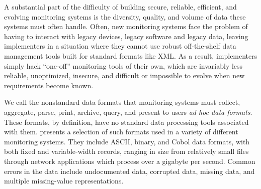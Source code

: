 \documentclass[10pt]{article}
\begin{document}
A substantial part of the difficulty of building secure, reliable, efficient,
and evolving monitoring systems is the diversity, quality, and volume of data
these systems must often handle.  Often, new monitoring
systems face the problem of having to interact with legacy devices,
legacy software and legacy data, leaving implementers in a situation
where they cannot use robust off-the-shelf data management tools built for
standard formats like XML.  As a result, implementers simply
hack ``one-off'' monitoring tools of their own, which are invariably
less reliable, unoptimized, insecure, and difficult or impossible to evolve
when new requirements become known.

We call the nonstandard data formats that monitoring systems must
collect, aggregate, parse, print, archive, query, and present to 
users {\em ad hoc data formats}.   These formats, by definition,
have no standard data processing tools associated with them.
 presents a selection of such formats
used in a variety of different monitoring systems.
They include ASCII, binary, and Cobol data formats, with
both fixed and variable-width records, ranging in size from
relatively small files through network applications which process over
a gigabyte per second.  Common errors in the data include undocumented data,
corrupted data, missing data, and multiple missing-value
representations.
\end{document}

